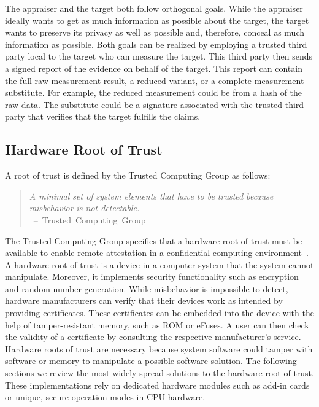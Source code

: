 The appraiser and the target both follow orthogonal goals. While the appraiser
ideally wants to get as much information as possible about the target, the
target wants to preserve its privacy as well as possible and, therefore, conceal
as much information as possible. Both goals can be realized by employing a
trusted third party local to the target who can measure the target. This
third party then sends a signed report of the evidence on behalf of the
target. This report can contain the full raw measurement result, a reduced
variant, or a complete measurement substitute. For example, the reduced
measurement could be from a hash of the raw data. The substitute could be a
signature associated with the trusted third party that verifies that the target
fulfills the claims.

\subsection{Hardware Root of Trust}
\label{sec:20:hardware_root_of_trust}
A root of trust is defined by the Trusted Computing Group as follows:
\begin{quote}
  \textit{ A minimal set of system elements that have to be trusted because
    misbehavior is not detectable. \\
  } \mbox{ -- Trusted Computing Group~\cite{tpm_architecture}}
\end{quote}

The Trusted Computing Group specifies that a hardware root of trust must be
available to enable remote attestation in a confidential computing
environment~\cite{tpm_architecture}. A hardware root of trust is a device in a
computer system that the system cannot manipulate. Moreover, it implements
security functionality such as encryption and random number generation. While
misbehavior is impossible to detect, hardware manufacturers can verify that
their devices work as intended by providing certificates. These certificates can
be embedded into the device with the help of tamper-resistant memory, such as
ROM or eFuses. A user can then check the validity of a certificate by consulting
the respective manufacturer's service. \\

Hardware roots of trust are necessary because system software could tamper with
software or memory to manipulate a possible software solution. The following
sections we review the most widely spread solutions to the hardware root of
trust. These implementations rely on dedicated hardware modules such as add-in
cards or unique, secure operation modes in CPU hardware. \\

